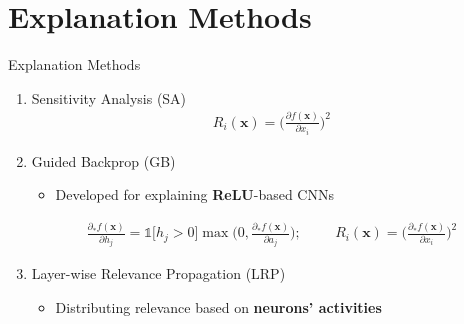 \documentclass[Nike]{tuberlinbeamer}
\newcommand{\x}[0]{\boldsymbol{x}}
\newcommand{\ppartial}[2]{\frac{\partial #1}{\partial #2}}
\begin{document}
\section{Explanation Methods}
\begin{frame}[allowframebreaks=0.95,t]{Explanation Methods}

\begin{enumerate}
	\item Sensitivity Analysis \citep{SimonyanDeepConvolutionalNetworks2013} (SA)
			\begin{align*}
				R_i(\x) = \bigg ( \ppartial{f(\x)}{x_i} \bigg )^2
			\end{align*}
	\item Guided Backprop \citep{SpringenbergStrivingSimplicityAll2015a} (GB) \\
		\begin{itemize}
			\item Developed for explaining \textbf{ReLU}-based CNNs
		\end{itemize}
				\begin{align*}
				\frac{\partial_{*} f(\x) }{\partial h_j} = \mathds{1} \bigg[  h_j > 0 \bigg]\max\bigg( 0, \frac{\partial_{*} f(\x) }{\partial a_j} \bigg);\hspace{1cm} R_i(\x) = \bigg( \frac{\partial_{*} f(\x) }{\partial x_i} \bigg )^2
			\end{align*}
	\framebreak
	
	\item Layer-wise Relevance Propagation \citep{BinderLayerWiseRelevancePropagation2016}  (LRP) 
		\begin{itemize}
			\item Distributing relevance based on \textbf{neurons' activities}
			\begin{columns}
\end{columns}
\end{itemize}
\end{enumerate}
\end{frame}
\end{document}

